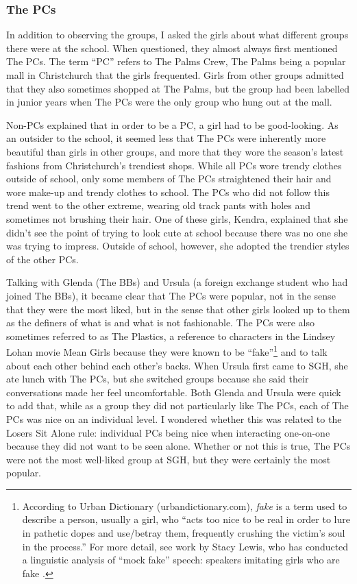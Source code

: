 \largerpage
\subsubsection{The PCs}
In addition to observing the groups, I asked the girls about what different groups there were at the school. When questioned, they almost always first mentioned The PCs. The term ``PC'' refers to The Palms Crew, The Palms being a popular mall in Christchurch that the girls frequented. Girls from other groups admitted that they also sometimes shopped at The Palms, but the group had been labelled in junior years when The PCs were the only group who hung out at the mall.

Non-PCs explained that in order to be a PC, a girl had to be good-looking. As an outsider to the school, it seemed less that The PCs were inherently more beautiful than girls in other groups, and more that they wore the season's latest fashions from Christchurch's trendiest shops. While all PCs wore trendy clothes outside of school, only some members of The PCs straightened their hair and wore make-up and trendy clothes to school. The PCs who did not follow this trend went to the other extreme, wearing old track pants with holes and sometimes not brushing their hair. One of these girls, Kendra, explained that she didn't see the point of trying to look cute at school because there was no one she was trying to impress. Outside of school, however, she adopted the trendier styles of the other PCs. 

Talking with Glenda (The BBs) and Ursula (a foreign exchange student who had joined The BBs), it became clear that The PCs were popular, not in the sense that they were the most liked, but in the sense that other girls looked up to them as the definers of what is and what is not fashionable. The PCs were also sometimes referred to as The Plastics, a reference to characters in the Lindsey Lohan movie Mean Girls because they were known to be ``fake''\footnote{According to Urban Dictionary (urbandictionary.com), \textit{fake} is a term used to describe a person, usually a girl, who ``acts too nice to be real in order to lure in pathetic dopes and use/betray them, frequently crushing the victim's soul in the process.''  For more detail, see work by Stacy Lewis, who has conducted a linguistic analysis of ``mock fake'' speech: speakers imitating girls who are fake \citep{lewis2007}.} and to talk about each other behind each other's backs. When Ursula first came to SGH, she ate lunch with The PCs, but she switched groups because she said their conversations made her feel uncomfortable. Both Glenda and Ursula were quick to add that, while as a group they did not particularly like The PCs, each of The PCs was nice on an individual level. I wondered whether this was related to the Losers Sit Alone rule: individual PCs being nice when interacting one-on-one because they did not want to be seen alone. Whether or not this is true, The PCs were not the most well-liked group at SGH, but they were certainly the most popular.

